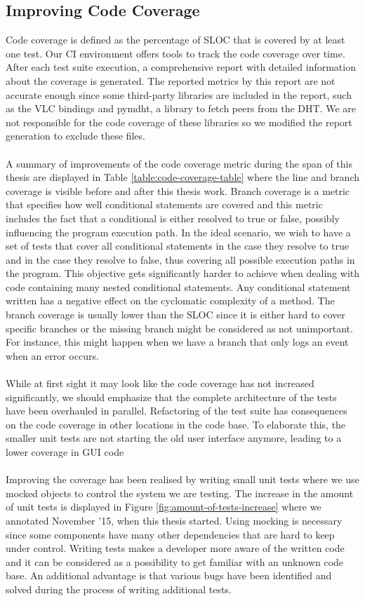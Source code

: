 \subsection{Improving Code Coverage}
Code coverage is defined as the percentage of SLOC that is covered by at least one test. Our CI environment offers tools to track the code coverage over time. After each test suite execution, a comprehensive report with detailed information about the coverage is generated. The reported metrics by this report are not accurate enough since some third-party libraries are included in the report, such as the VLC bindings and pymdht, a library to fetch peers from the DHT. We are not responsible for the code coverage of these libraries so we modified the report generation to exclude these files.\\\\
A summary of improvements of the code coverage metric during the span of this thesis are displayed in Table \ref{table:code-coverage-table} where the line and branch coverage is visible before and after this thesis work. Branch coverage is a metric that specifies how well conditional statements are covered and this metric includes the fact that a conditional is either resolved to true or false, possibly influencing the program execution path. In the ideal scenario, we wish to have a set of tests that cover all conditional statements in the case they resolve to true and in the case they resolve to false, thus covering all possible execution paths in the program. This objective gets significantly harder to achieve when dealing with code containing many nested conditional statements. Any conditional statement written has a negative effect on the cyclomatic complexity of a method. The branch coverage is usually lower than the SLOC since it is either hard to cover specific branches or the missing branch might be considered as not unimportant. For instance, this might happen when we have a branch that only logs an event when an error occurs.\\\\
While at first sight it may look like the code coverage has not increased significantly, we should emphasize that the complete architecture of the tests have been overhauled in parallel. Refactoring of the test suite has consequences on the code coverage in other locations in the code base. To elaborate this, the smaller unit tests are not starting the old user interface anymore, leading to a lower coverage in GUI code\\\\
Improving the coverage has been realised by writing small unit tests where we use mocked objects to control the system we are testing. The increase in the amount of unit tests is displayed in Figure \ref{fig:amount-of-tests-increase} where we annotated November '15, when this thesis started. Using mocking is necessary since some components have many other dependencies that are hard to keep under control. Writing tests makes a developer more aware of the written code and it can be considered as a possibility to get familiar with an unknown code base. An additional advantage is that various bugs have been identified and solved during the process of writing additional tests.\\


